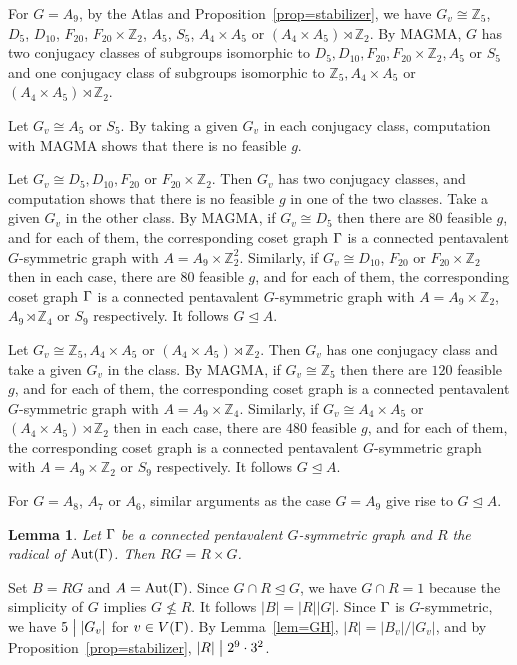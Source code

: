 \documentclass[12pt]{article}
\newtheorem{lem}{Lemma}[section]%
\def\di{\bigm|} \def\lg{\langle} \def\rg{\rangle}
\def\f{\noindent}
\def\Aut{\hbox{\rm Aut}}
\newcommand{\qed}{\mbox{\raisebox{0.7ex}{\fbox{}}} \vspace{4truemm}}
\def\mz{{\mathbb Z}}
\begin{document}
For $G= A_9$, by the Atlas \cite[p. 37]{Atlas} and Proposition~\ref{prop=stabilizer},
we have $G_v\cong \mz_5$, $D_5$, $D_{10}$, $F_{20}$, $F_{20}\times \mz_2$, $A_5$, $S_5$,
$A_4\times A_5$ or $(A_4\times A_5)\rtimes \mz_2$. By MAGMA, $G$ has two conjugacy classes of subgroups isomorphic to $ D_5, D_{10}, F_{20}, F_{20}\times \mz_2, A_5$ or $S_5$ and one conjugacy class of subgroups isomorphic to $\mz_5, A_4\times A_5$ or $(A_4\times A_5)\rtimes \mz_2$.

Let $G_v\cong A_5$ or $S_5$. By taking a given $G_v$ in each conjugacy class,
computation with MAGMA shows that there is no feasible $g$.

Let $G_v\cong D_5, D_{10}, F_{20}$ or $F_{20}\times \mz_2$. Then $G_v$ has two conjugacy classes,
and computation shows that there is no feasible $g$ in one of the two classes. Take a given $G_v$
in the other class. By MAGMA, if $G_v\cong D_5$ then there are $80$ feasible $g$, and for each of them,
the corresponding coset graph $\Gamma$ is a connected pentavalent $G$-symmetric graph with $A=A_9\times \mz_2^2$.
Similarly, if $G_v\cong D_{10}$, $F_{20}$ or $F_{20}\times \mz_2$ then  in each case,
there are $80$ feasible $g$, and for each of them, the corresponding coset graph $\Gamma$
is a connected pentavalent $G$-symmetric graph with $A=A_9\times \mz_2$, $A_9\rtimes \mz_4$ or $S_9$ respectively. It follows $G\unlhd A$.

Let $G_v\cong \mz_5, A_4 \times A_5$ or $(A_4 \times A_5)\rtimes \mz_2$. Then $G_v$ has one conjugacy
class and take a given $G_v$ in the class. By MAGMA, if $G_v\cong \mz_5$ then there are $120$ feasible $g$,
and for each of them, the corresponding coset graph is a connected pentavalent $G$-symmetric graph with $A= A_9\times \mz_4$. Similarly, if $G_v \cong A_4 \times A_5$ or $(A_4 \times A_5)\rtimes \mz_2$
then in each case, there are $480$ feasible $g$, and for each of them, the corresponding coset graph
is a connected pentavalent $G$-symmetric graph with $A= A_9\times \mz_2$ or $S_9$ respectively. It follows $G\unlhd A$.

For $G=A_8$, $A_7$ or $A_6$, similar arguments as the case $G=A_9$ give rise to $G\unlhd A$.
\hfill\qed

\begin{lem}\label{lem=GP} Let $\Gamma$ be a connected pentavalent $G$-symmetric graph and $R$ the radical of $\Aut(\G)$.
Then $RG=R\times G$.
\end{lem}

\f {\bf Proof:} Set $B=RG$ and $A=\Aut(\G)$. Since $G\cap R\unlhd G$, we have  $G\cap R=1$ because the simplicity of $G$ implies $G\not\leq R$. It follows $|B|=|R||G|$.
Since $\Gamma$ is $G$-symmetric, we have $5\di|G_v|$ for $v\in V(\Gamma)$. By Lemma~\ref{lem=GH}, $|R|=|B_v|/|G_v|$, and by Proposition~\ref{prop=stabilizer}, $|R|\di 2^9\cdot3^2$.
\end{document}
